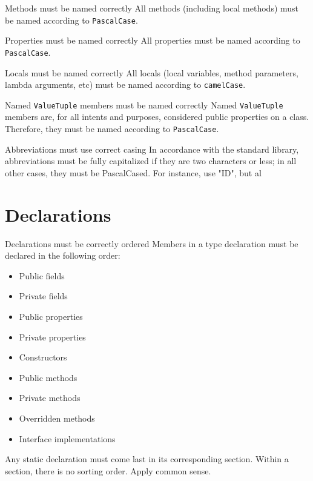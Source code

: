\documentclass[11pt,a4paper]{article}
\begin{document}
\begin{must}{Methods must be named correctly}
All methods (including local methods) must be named according to \texttt{PascalCase}.
\end{must}

\begin{must}{Properties must be named correctly}
All properties must be named according to \texttt{PascalCase}.
\end{must}

\begin{must}{Locals must be named correctly}
All locals (local variables, method parameters, lambda arguments, etc) must be named according to \texttt{camelCase}.
\end{must}

\begin{must}{Named \texttt{ValueTuple} members must be named correctly}
Named \texttt{ValueTuple} members are, for all intents and purposes, considered public properties on a class. Therefore, they must be named according to \texttt{PascalCase}.
\end{must}

\begin{must}{Abbreviations must use correct casing}
In accordance with the standard library, abbreviations must be fully capitalized if they are two characters or less; in all other cases, they must be PascalCased. For instance, use "ID", but al
\end{must}

\section{Declarations}
\begin{must}{Declarations must be correctly ordered}
Members in a type declaration must be declared in the following order:
\begin{itemize}
\item Public fields
\item Private fields
\item Public properties
\item Private properties
\item Constructors
\item Public methods
\item Private methods
\item Overridden methods
\item Interface implementations
\end{itemize}

Any static declaration must come last in its corresponding section. Within a section, there is no sorting order. Apply common sense.
\end{must}
\end{document}
